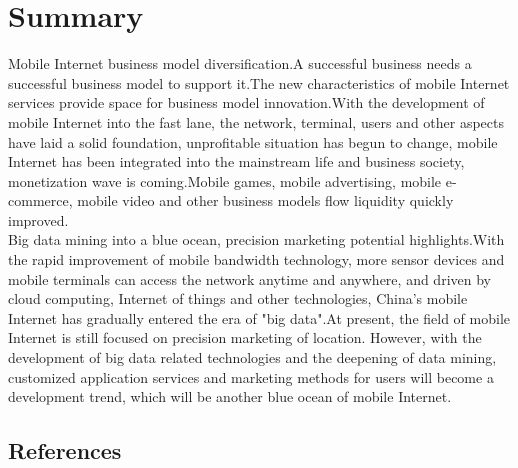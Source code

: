 \documentclass{elsarticle}
\begin{document}
\section{Summary}\label{sec:summary}
Mobile Internet business model diversification.A successful business needs a successful business model to support it.The new characteristics of mobile Internet services provide space for business model innovation.With the development of mobile Internet into the fast lane, the network, terminal, users and other aspects have laid a solid foundation, unprofitable situation has begun to change, mobile Internet has been integrated into the mainstream life and business society, monetization wave is coming.Mobile games, mobile advertising, mobile e-commerce, mobile video and other business models flow liquidity quickly improved.\\

Big data mining into a blue ocean, precision marketing potential highlights.With the rapid improvement of mobile bandwidth technology, more sensor devices and mobile terminals can access the network anytime and anywhere, and driven by cloud computing, Internet of things and other technologies, China's mobile Internet has gradually entered the era of "big data".At present, the field of mobile Internet is still focused on precision marketing of location. However, with the development of big data related technologies and the deepening of data mining, customized application services and marketing methods for users will become a development trend, which will be another blue ocean of mobile Internet.

\begin{CJK*}{UTF8}{gkai}

\section*{References}

\small
\nocite{*}

%
%
	
	
\end{CJK*}
\end{document}
